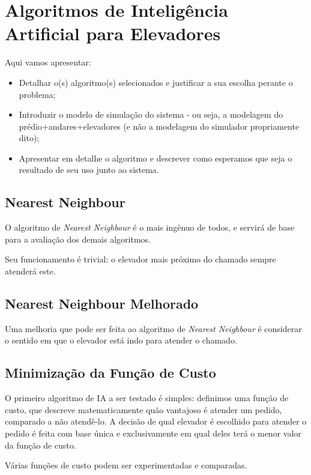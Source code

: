 \chapter{\label{chap:ai}Algoritmos de Inteligência Artificial para Elevadores}

Aqui vamos apresentar:

\begin{itemize}
\item Detalhar o(s) algoritmo(s) selecionados e justificar a sua escolha perante o problema;
\item Introduzir o modelo de simulação do sistema - ou seja, a modelagem do
prédio+andares+elevadores (e não a modelagem do simulador propriamente dito);
\item Apresentar em detalhe o algoritmo e descrever como esperamos que seja o resultado de seu uso junto ao sistema.
\end{itemize}
\section{\label{sec:ai:nn}Nearest Neighbour}

O algoritmo de \textit{Nearest Neighbour} é o mais ingênuo de todos, e servirá
de base para a avaliação dos demais algoritmos.

Seu funcionamento é trivial: o elevador mais próximo do chamado sempre
atenderá este.

\section{\label{sec:ai:nnm}Nearest Neighbour Melhorado}

Uma melhoria que pode ser feita ao algoritmo de \textit{Nearest Neighbour}
é considerar o sentido em que o elevador está indo para atender o chamado.

\section{\label{sec:ai:minimize-cost-function}Minimização da Função de Custo}

O primeiro algoritmo de IA a ser testado é simples: definimos uma
função de custo, que descreve matematicamente quão vantajoso é atender um
pedido, comparado a não atendê-lo. A decisão de qual elevador é escolhido para
atender o pedido é feita com base única e exclusivamente em qual deles terá o
menor valor da função de custo.

Várias funções de custo podem ser experimentadas e comparadas.

